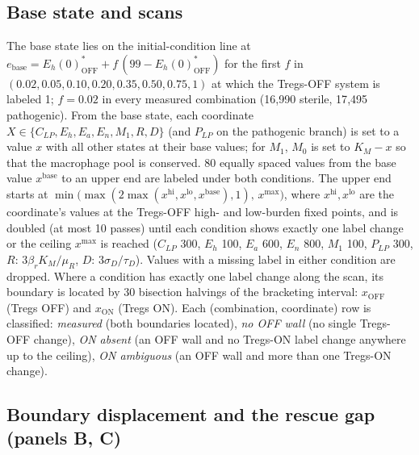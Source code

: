 \documentclass[11pt]{article}
\begin{document}
\subsection{Base state and scans}

The base state lies on the initial-condition line at
$e_{\mathrm{base}} = E_h(0)^*_{\mathrm{OFF}} + f\,(99 - E_h(0)^*_{\mathrm{OFF}})$ for the first $f$ in
$(0.02, 0.05, 0.10, 0.20, 0.35, 0.50, 0.75, 1)$ at which the Tregs-OFF system is labeled 1;
$f = 0.02$ in every measured combination (16{,}990 sterile, 17{,}495 pathogenic). From the base
state, each coordinate $X \in \{C_{LP}, E_h, E_a, E_n, M_1, R, D\}$ (and $P_{LP}$ on the pathogenic
branch) is set to a value $x$ with all other states at their base values; for $M_1$, $M_0$ is set
to $K_M - x$ so that the macrophage pool is conserved. 80 equally spaced values from the base
value $x^{\mathrm{base}}$ to an upper end are labeled under both conditions. The upper end starts at
$\min\!\big(\max(2\max(x^{\mathrm{hi}}, x^{\mathrm{lo}}, x^{\mathrm{base}}), 1),\, x^{\max}\big)$, where
$x^{\mathrm{hi}}, x^{\mathrm{lo}}$ are the coordinate's values at the Tregs-OFF high- and low-burden
fixed points, and is doubled (at most 10 passes) until each condition shows exactly one label
change or the ceiling $x^{\max}$ is reached ($C_{LP}$ 300, $E_h$ 100, $E_a$ 600, $E_n$ 800,
$M_1$ 100, $P_{LP}$ 300, $R$: $3\beta_rK_M/\mu_R$, $D$: $3\sigma_D/\tau_D$). Values with a
missing label in either condition are dropped. Where a condition has exactly one label change
along the scan, its boundary is located by 30 bisection halvings of the bracketing interval:
$x_{\mathrm{OFF}}$ (Tregs OFF) and $x_{\mathrm{ON}}$ (Tregs ON). Each (combination, coordinate) row is
classified: \emph{measured} (both boundaries located), \emph{no OFF wall} (no single Tregs-OFF
change), \emph{ON absent} (an OFF wall and no Tregs-ON label change anywhere up to the ceiling),
\emph{ON ambiguous} (an OFF wall and more than one Tregs-ON change).

\subsection{Boundary displacement and the rescue gap (panels B, C)}
\end{document}
